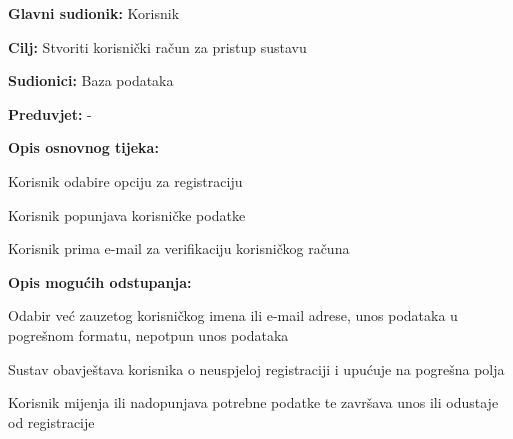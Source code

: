 					\noindent {}
					\begin{packed_item}
	
						\item \textbf{Glavni sudionik: }Korisnik
						\item  \textbf{Cilj:} Stvoriti korisnički račun za pristup sustavu
						\item  \textbf{Sudionici:} Baza podataka
						\item  \textbf{Preduvjet:} -
						\item  \textbf{Opis osnovnog tijeka:}
						
						\item[] \begin{packed_enum}
	
							\item Korisnik odabire opciju za registraciju
							\item Korisnik popunjava korisničke podatke
							\item Korisnik prima e-mail za verifikaciju korisničkog računa
						\end{packed_enum}
						
						\item  \textbf{Opis mogućih odstupanja:}
						
						\item[] \begin{packed_item}
	
							\item[2.a] Odabir već zauzetog korisničkog imena ili e-mail adrese, unos podataka
							u pogrešnom formatu, nepotpun unos podataka
							\item[] \begin{packed_enum}
								
								\item Sustav obavještava korisnika o neuspjeloj registraciji i upućuje na pogrešna polja
								\item Korisnik mijenja ili nadopunjava potrebne podatke te završava unos ili odustaje od registracije
								
							\end{packed_enum}
							
						\end{packed_item}
					\end{packed_item}
					
